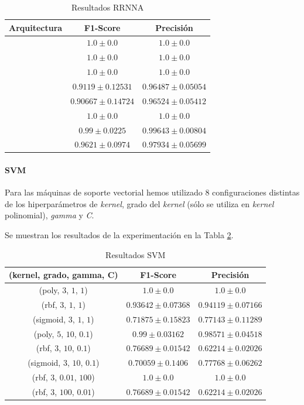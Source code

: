 \documentclass[12pt]{article}
\begin{document}
\begin{table}[ht]
	\caption{Resultados RRNNA}
	\centering
		 \begin{tabular}{||c c c||}
			 \hline
			 Arquitectura & F1-Score & Precisión  \\ [0.5ex]
			 \hline\hline
			 [2] & $1.0 \pm 0.0$ & $1.0 \pm 0.0$ \\
			 \hline
			 [4] & $1.0 \pm 0.0$ & $1.0 \pm 0.0$ \\
			 \hline
			 [8] & $1.0 \pm 0.0$ & $1.0 \pm 0.0$ \\
			 \hline
			 [2, 4] & $0.9119 \pm 0.12531$ & $0.96487 \pm 0.05054$ \\
			 \hline
			 [2, 8] & $0.90667 \pm 0.14724$ & $0.96524 \pm 0.05412$ \\
			 \hline
			 [4, 2] & $1.0 \pm 0.0$ & $1.0 \pm 0.0$ \\
			 \hline
			 [4, 4] & $0.99 \pm 0.0225$ & $0.99643 \pm 0.00804$ \\
			 \hline
			 [4, 8] & $0.9621 \pm 0.0974$ & $0.97934 \pm 0.05699$ \\
			 \hline
		 \end{tabular}
	\label{Tab:ANN_1}
\end{table}

\paragraph{SVM}

Para las máquinas de soporte vectorial hemos utilizado 8 configuraciones distintas de los hiperparámetros de \textit{kernel},
grado del \textit{kernel} (sólo se utiliza en \textit{kernel} polinomial), \textit{gamma} y \textit{C}.

Se muestran los resultados de la experimentación en la Tabla \ref{Tab:SVM_1}.

\begin{table}[!ht]
	\caption{Resultados SVM}
	\centering
		\begin{tabular}{||c c c||}
			\hline
			(kernel, grado, gamma, C) & F1-Score & Precisión  \\ [0.5ex]
			\hline\hline
			(poly, $3$, $1$, $1$) & $1.0 \pm 0.0$ & $1.0 \pm 0.0$ \\
			\hline
			(rbf, $3$, $1$, $1$) & $0.93642 \pm 0.07368$ & $0.94119 \pm 0.07166$ \\
			\hline
			(sigmoid, $3$, $1$, $1$) & $0.71875 \pm 0.15823$ & $0.77143 \pm 0.11289$ \\
			\hline
			(poly, $5$, $10$, $0.1$) & $0.99 \pm 0.03162$ & $0.98571 \pm 0.04518$ \\
			\hline
			(rbf, $3$, $10$, $0.1$) & $0.76689 \pm 0.01542$ & $0.62214 \pm 0.02026$ \\
			\hline
			(sigmoid, $3$, $10$, $0.1$) & $0.70059 \pm 0.1406$ & $0.77768 \pm 0.06262$ \\
			\hline
			(rbf, $3$, $0.01$, $100$) & $1.0 \pm 0.0$ & $1.0 \pm 0.0$ \\
			\hline
			(rbf, $3$, $100$, $0.01$) & $0.76689 \pm 0.01542$ & $0.62214 \pm 0.02026$ \\
			\hline
		\end{tabular}
	\label{Tab:SVM_1}
\end{table}
\end{document}
